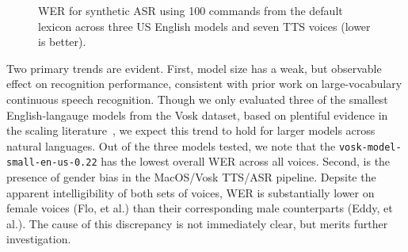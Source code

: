 \documentclass[conference]{IEEEtran}
\begin{document}
\begin{figure}[ht!]
    \centering
    \begin{table}
    \end{table}
    \caption{WER for synthetic ASR using 100 commands from the default lexicon across three US English models and seven TTS voices (lower is better).}
    \label{fig:fig1}
\end{figure}

Two primary trends are evident. First, model size has a weak, but observable effect on recognition performance, consistent with prior work on large-vocabulary continuous speech recognition. Though we only evaluated three of the smallest English-langauge models from the Vosk dataset, based on plentiful evidence in the scaling literature~\cite{droppo2021scaling}, we expect this trend to hold for larger models across natural languages. Out of the three models tested, we note that the \texttt{vosk-model-small-en-us-0.22} has the lowest overall WER across all voices. Second, is the presence of gender bias in the MacOS/Vosk TTS/ASR pipeline. Depsite the apparent intelligibility of both sets of voices, WER is substantially lower on female voices (Flo, et al.) than their corresponding male counterparts (Eddy, et al.). The cause of this discrepancy is not immediately clear, but merits further investigation.
\end{document}
